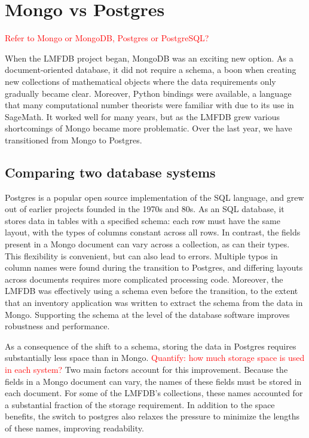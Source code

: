 \documentclass{article}
\newcommand{\todo}[1]{\textcolor{red}{#1}}
\begin{document}
\section{Mongo vs Postgres}

\todo{Refer to Mongo or MongoDB, Postgres or PostgreSQL?}

When the LMFDB project began, MongoDB was an exciting new option.  As a document-oriented database, it did not require a schema, a boon when creating new collections of mathematical objects where the data requirements only gradually became clear.  Moreover, Python bindings were available, a language that many computational number theorists were familiar with due to its use in SageMath.  It worked well for many years, but as the LMFDB grew various shortcomings of Mongo became more problematic.  Over the last year, we have transitioned from Mongo to Postgres.

\subsection{Comparing two database systems}

Postgres is a popular open source implementation of the SQL language, and grew out of earlier projects founded in the 1970s and 80s.  As an SQL database, it stores data in tables with a specified schema: each row must have the same layout, with the types of columns constant across all rows.  In contrast, the fields present in a Mongo document can vary across a collection, as can their types.  This flexibility is convenient, but can also lead to errors.  Multiple typos in column names were found during the transition to Postgres, and differing layouts across documents requires more complicated processing code.  Moreover, the LMFDB was effectively using a schema even before the transition, to the extent that an inventory application was written to extract the schema from the data in Mongo.  Supporting the schema at the level of the database software improves robustness and performance.

As a consequence of the shift to a schema, storing the data in Postgres requires substantially less space than in Mongo.  \todo{Quantify: how much storage space is used in each system?} Two main factors account for this improvement.  Because the fields in a Mongo document can vary, the names of these fields must be stored in each document.  For some of the LMFDB's collections, these names accounted for a substantial fraction of the storage requirement.  In addition to the space benefits, the switch to postgres also relaxes the pressure to minimize the lengths of these names, improving readability.
\end{document}
